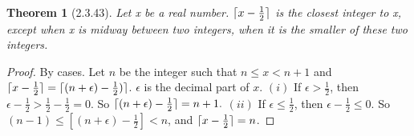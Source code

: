 \documentclass[a4paper, 12pt]{article}
\theoremstyle{plain}
\newtheorem*{theorem*}{Theorem}
\DeclarePairedDelimiter{\ceil}{\lceil}{\rceil}
\begin{document}
	
	\begin{theorem*}[2.3.43]
		Let x be a real number. $\ceil{x - \frac{1}{2}}$ is the closest integer to x, except when x is midway between two integers, when it is the smaller of these two integers.
	\end{theorem*}
	
	\begin{proof}
		By cases. Let $n$ be the integer such that $n \le x < n+1$ and \newline $\ceil{x - \frac{1}{2}} = \ceil{(n + \epsilon) - \frac{1}{2})}$. $\epsilon$ is the decimal part of $x$.
		\newline \newline $(i)$ If $\epsilon > \frac{1}{2}$, then $\epsilon - \frac{1}{2} > \frac{1}{2} - \frac{1}{2} = 0$. So $\ceil{(n + \epsilon) - \frac{1}{2}} = n + 1.$ \newline \newline $(ii)$ If $\epsilon \le \frac{1}{2}$, then $\epsilon - \frac{1}{2} \le 0$. So $(n - 1) \le [(n + \epsilon) - \frac{1}{2}] < n$, and $\ceil{x - \frac{1}{2}} = n$.
	\end{proof}
\end{document}
